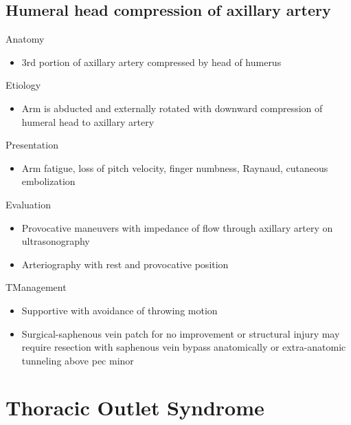 \documentclass[
]{book}
\providecommand{\tightlist}{%
  \setlength{\itemsep}{0pt}\setlength{\parskip}{0pt}}
\begin{document}
\hypertarget{humeral-head-compression-of-axillary-artery}{%
\subsection{Humeral head compression of axillary artery}\label{humeral-head-compression-of-axillary-artery}}

Anatomy

\begin{itemize}
\tightlist
\item
  3rd portion of axillary artery compressed by head of humerus
\end{itemize}

Etiology

\begin{itemize}
\tightlist
\item
  Arm is abducted and externally rotated with downward compression of
  humeral head to axillary artery
\end{itemize}

Presentation

\begin{itemize}
\tightlist
\item
  Arm fatigue, loss of pitch velocity, finger numbness, Raynaud,
  cutaneous embolization
\end{itemize}

Evaluation

\begin{itemize}
\item
  Provocative maneuvers with impedance of flow through axillary artery
  on ultrasonography
\item
  Arteriography with rest and provocative position
\end{itemize}

TManagement

\begin{itemize}
\item
  Supportive with avoidance of throwing motion
\item
  Surgical-saphenous vein patch for no improvement or structural
  injury may require resection with saphenous vein bypass anatomically
  or extra-anatomic tunneling above pec minor
\end{itemize}

\hypertarget{thoracic-outlet-syndrome}{%
\section{Thoracic Outlet Syndrome}\label{thoracic-outlet-syndrome}}
\end{document}
